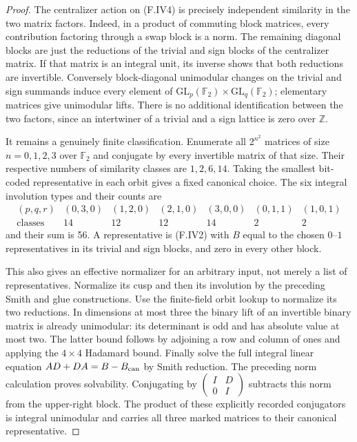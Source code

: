 \begin{proof}
The centralizer action on (F.IV4) is precisely independent
similarity in the two matrix factors.  Indeed, in a product
of commuting block matrices, every contribution factoring
through a swap block is a norm.  The remaining diagonal
blocks are just the reductions of the trivial and sign
blocks of the centralizer matrix.  If that matrix is an
integral unit, its inverse shows that both reductions are
invertible.  Conversely block-diagonal unimodular changes
on the trivial and sign summands induce every element of
$\mathrm{GL}_p(\mathbb F_2)\times
\mathrm{GL}_q(\mathbb F_2)$; elementary matrices give
unimodular lifts.  There is no additional identification
between the two factors, since an intertwiner of a trivial
and a sign lattice is zero over $\mathbb Z$.

It remains a genuinely finite classification.  Enumerate
all $2^{n^2}$ matrices of size $n=0,1,2,3$ over $\mathbb F_2$
and conjugate by every invertible matrix of that size.
Their respective numbers of similarity classes are
$1,2,6,14$.  Taking the smallest bit-coded representative
in each orbit gives a fixed canonical choice.
The six integral involution types and their counts are
\[
\begin{array}{c|rrrrrr}
 (p,q,r)&(0,3,0)&(1,2,0)&(2,1,0)&(3,0,0)&(0,1,1)&(1,0,1)\\\hline
 \text{classes}&14&12&12&14&2&2
\end{array}
\]
and their sum is 56.  A representative is (F.IV2) with
$B$ equal to the chosen $0$--$1$ representatives in its
trivial and sign blocks, and zero in every other block.

This also gives an effective normalizer for an arbitrary
input, not merely a list of representatives.  Normalize its
cusp and then its involution by the preceding Smith and
glue constructions.  Use the finite-field orbit lookup to
normalize its two reductions.  In dimensions at most three
the binary lift of an invertible binary matrix is already
unimodular: its determinant is odd and has absolute value
at most two.  The latter bound follows by adjoining a row
and column of ones and applying the $4\times4$ Hadamard
bound.  Finally solve the full integral linear equation
$AD+DA=B-B_{\rm can}$ by Smith reduction.  The preceding
norm calculation proves solvability.  Conjugating by
$\begin{pmatrix}I&D\\0&I\end{pmatrix}$ subtracts this norm
from the upper-right block.  The product of these explicitly
recorded conjugators is integral unimodular and carries all
three marked matrices to their canonical representative.


\end{proof}
